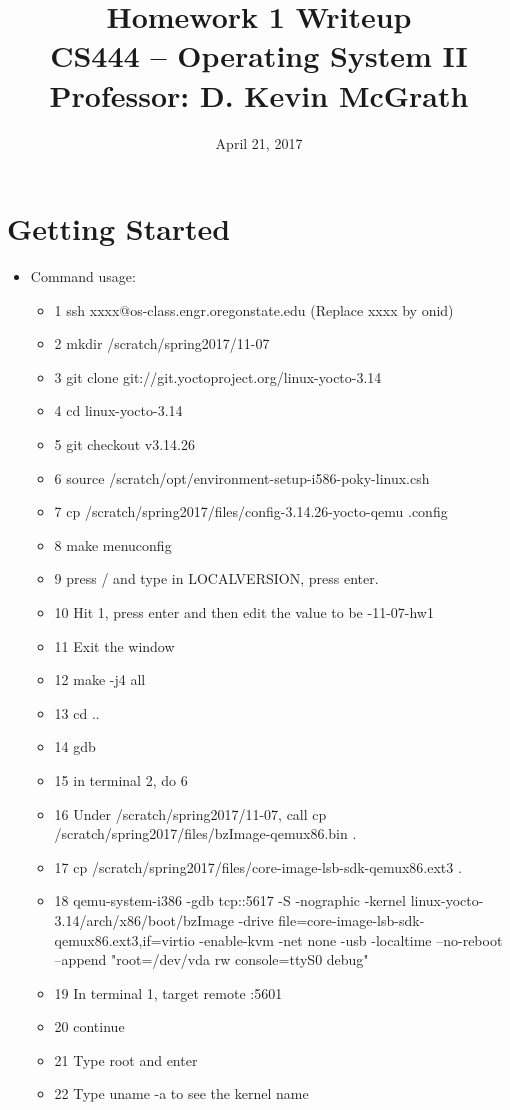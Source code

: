 \documentclass[letterpaper,10pt,titlepage]{article}
\title{
\textbf{\huge{Homework 1 Writeup}} \\
\hfill \break
\hfill \break
\large{CS444 -- Operating System II} \\
\hfill \break
\large{Professor: D. Kevin McGrath}}
\author{\name}
\date{April 21, 2017}
\begin{document}
\maketitle
\section{Getting Started}
\begin{itemize}
    \item Command usage:
        \begin{itemize}
            \item 1 ssh xxxx@os-class.engr.oregonstate.edu (Replace xxxx by onid)
            \item 2 mkdir /scratch/spring2017/11-07  
            \item 3 git clone git://git.yoctoproject.org/linux-yocto-3.14 
            \item 4 cd linux-yocto-3.14
            \item 5 git checkout v3.14.26 
            \item 6 source /scratch/opt/environment-setup-i586-poky-linux.csh 
            \item 7 cp /scratch/spring2017/files/config-3.14.26-yocto-qemu .config
            \item 8 make menuconfig
            \item 9 press / and type in LOCALVERSION, press enter. 
            \item 10 Hit 1, press enter and then edit the value to be -11-07-hw1
            \item 11 Exit the window
            \item 12 make -j4 all
            \item 13 cd .. 
            \item 14 gdb
            \item 15 in terminal 2, do 6
            \item 16 Under /scratch/spring2017/11-07, call cp /scratch/spring2017/files/bzImage-qemux86.bin .
            \item 17 cp /scratch/spring2017/files/core-image-lsb-sdk-qemux86.ext3 .
            \item 18 qemu-system-i386 -gdb tcp::5617 -S -nographic -kernel linux-yocto-3.14/arch/x86/boot/bzImage  -drive file=core-image-lsb-sdk-qemux86.ext3,if=virtio -enable-kvm -net none -usb -localtime --no-reboot --append "root=/dev/vda rw console=ttyS0 debug"
            \item 19 In terminal 1, target remote :5601
            \item 20 continue
            \item 21 Type root and enter
            \item 22 Type uname -a to see the kernel name
        \end{itemize}    
\end{itemize}
\end{document}
